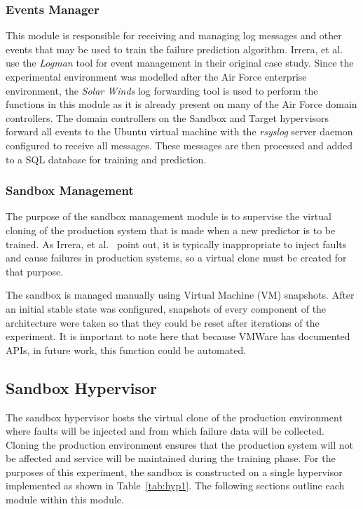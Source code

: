\subsubsection{Events Manager} \label{sec:eventsManagerMgr}
This module is responsible for receiving and managing log messages and other
events that may be used to train the failure prediction algorithm.  Irrera, et
al.~\cite{irrera2015} use the \emph{Logman} tool for event management in their
original case study.  Since the experimental environment was modelled after the
Air Force enterprise environment, the \emph{Solar Winds} log forwarding tool is
used to perform the functions in this module as it is already present on many
of the Air Force domain controllers.  The domain controllers on the Sandbox and
Target hypervisors forward all events to the Ubuntu virtual machine with the
\emph{rsyslog} server daemon configured to receive all messages.  These
messages are then processed and added to a SQL database for training and
prediction.  

\subsubsection{Sandbox Management} \label{sec:sandboxMgr} 
The purpose of the sandbox management module is to supervise the virtual
cloning of the production system that is made when a new predictor is to be
trained.  As Irrera, et al.~\cite{irrera2015,irrera2013} point out, it is
typically inappropriate to inject faults and cause failures in production
systems, so a virtual clone must be created for that purpose.

The sandbox is managed manually using Virtual Machine (VM) snapshots.  After an
initial stable state was configured, snapshots of every component of the
architecture were taken so that they could be reset after iterations of the
experiment.  It is important to note here that because VMWare has documented
APIs, in future work, this function could be automated.

\subsection{Sandbox Hypervisor} \label{sec:sandbox}
The sandbox hypervisor hosts the virtual clone of the production environment
where faults will be injected and from which failure data will be collected.
Cloning the production environment ensures that the production system will not
be affected and service will be maintained during the training phase.  For the
purposes of this experiment, the sandbox is constructed on a single hypervisor
implemented as shown in Table~\ref{tab:hyp1}.  The following sections outline
each module within this module.

